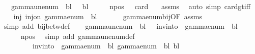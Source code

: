 \begin{isabellebody}
\ \ \ {\isachardoublequoteopen}gamma{\isacharunderscore}{\kern0pt}unenum\ {\isasymGamma}\ bl\ {}\ {\isacharequal}{\kern0pt}\ bl{\isachardoublequoteclose}\isanewline
%
\isadelimproof
%
\endisadelimproof
%
\isatagproof
{}\isamarkupfalse%
\ {\isacharminus}{\kern0pt}\isanewline
\ \ \isamarkupfalse%
\ npos{\isacharcolon}{\kern0pt}\ {\isachardoublequoteopen}{}\ {\isacharless}{\kern0pt}\ card\ {\isasymGamma}{\isachardoublequoteclose}\ \isamarkupfalse%
\ assms\ \isamarkupfalse%
\ {\isacharparenleft}{\kern0pt}auto\ simp{\isacharcolon}{\kern0pt}\ card{\isacharunderscore}{\kern0pt}gt{\isacharunderscore}{\kern0pt}{}{\isacharunderscore}{\kern0pt}iff{\isacharparenright}{\kern0pt}\isanewline
\ \ \isamarkupfalse%
\ inj{\isacharcolon}{\kern0pt}\ {\isachardoublequoteopen}inj{\isacharunderscore}{\kern0pt}on\ {\isacharparenleft}{\kern0pt}gamma{\isacharunderscore}{\kern0pt}enum\ {\isasymGamma}\ bl{\isacharparenright}{\kern0pt}\ {\isasymGamma}{\isachardoublequoteclose}\isanewline
\ \ \ \ \isamarkupfalse%
\ gamma{\isacharunderscore}{\kern0pt}enum{\isacharunderscore}{\kern0pt}bij{\isacharbrackleft}{\kern0pt}OF\ assms{\isacharparenleft}{\kern0pt}{}{\isacharparenright}{\kern0pt}{\isacharbrackright}{\kern0pt}\ \isamarkupfalse%
\ {\isacharparenleft}{\kern0pt}simp\ add{\isacharcolon}{\kern0pt}\ bij{\isacharunderscore}{\kern0pt}betw{\isacharunderscore}{\kern0pt}def{\isacharparenright}{\kern0pt}\isanewline
\ \ \isamarkupfalse%
\ {\isachardoublequoteopen}gamma{\isacharunderscore}{\kern0pt}unenum\ {\isasymGamma}\ bl\ {}\ {\isacharequal}{\kern0pt}\ inv{\isacharunderscore}{\kern0pt}into\ {\isasymGamma}\ {\isacharparenleft}{\kern0pt}gamma{\isacharunderscore}{\kern0pt}enum\ {\isasymGamma}\ bl{\isacharparenright}{\kern0pt}\ {}{\isachardoublequoteclose}\isanewline
\ \ \ \ \isamarkupfalse%
\ npos\ \isamarkupfalse%
\ {\isacharparenleft}{\kern0pt}simp\ add{\isacharcolon}{\kern0pt}\ gamma{\isacharunderscore}{\kern0pt}unenum{\isacharunderscore}{\kern0pt}def{\isacharparenright}{\kern0pt}\isanewline
\ \ \isamarkupfalse%
\ \isamarkupfalse%
\ {\isachardoublequoteopen}{\isasymdots}\isanewline
\ \ \ \ \ \ \ \ {\isacharequal}{\kern0pt}\ inv{\isacharunderscore}{\kern0pt}into\ {\isasymGamma}\ {\isacharparenleft}{\kern0pt}gamma{\isacharunderscore}{\kern0pt}enum\ {\isasymGamma}\ bl{\isacharparenright}{\kern0pt}\ {\isacharparenleft}{\kern0pt}gamma{\isacharunderscore}{\kern0pt}enum\ {\isasymGamma}\ bl\ bl{\isacharparenright}{\kern0pt}{\isachardoublequoteclose}\isanewline

\end{isabellebody}
